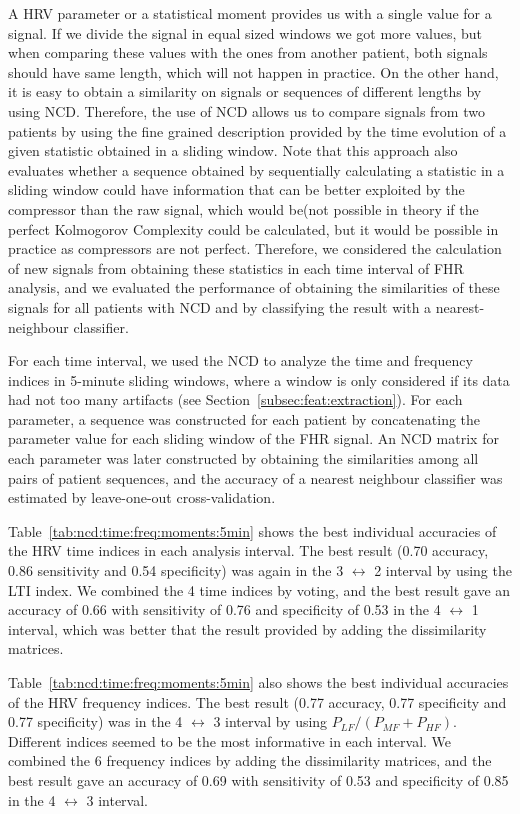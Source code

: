 A HRV parameter or a statistical moment provides us with a single value for a signal. If we divide the signal in equal sized windows we got more values, but when comparing  these values with the ones from another patient, both signals should have same length, which will not happen in practice. On the other hand, it is easy to obtain a similarity on signals or sequences of different lengths by using NCD. Therefore, the use of NCD allows us to compare signals from two patients by using the fine grained description provided by the time evolution of a given statistic obtained in a sliding window.
Note that this approach  also evaluates whether  a sequence obtained by sequentially calculating a statistic in a sliding window could have information that can be better exploited by the compressor than the raw signal, which would be(not possible in theory if the  perfect Kolmogorov Complexity could be calculated, but it would be possible in practice as compressors are not perfect.
Therefore, we considered  the calculation of new signals from obtaining these statistics in each time interval of FHR analysis, and we evaluated the performance of obtaining the similarities of these signals for all patients with NCD and by classifying the result with a nearest-neighbour classifier. 


For each time interval, we used the NCD to analyze the time and frequency indices in 5-minute sliding windows, where a window is only considered if its data had not too many artifacts (see Section~\ref{subsec:feat:extraction}). For each parameter, a sequence was constructed for each patient by  concatenating the parameter value for each sliding window of the FHR signal. An NCD matrix for each parameter was later constructed by obtaining the similarities among all pairs of patient sequences, and  the accuracy of a nearest neighbour classifier was estimated by leave-one-out cross-validation.

Table~\ref{tab:ncd:time:freq:moments:5min} shows the best individual accuracies of the HRV time indices in each analysis interval. The best result (0.70 accuracy, 0.86 sensitivity and 0.54 specificity) was again in the  3 $\leftrightarrow$  2 interval by using the LTI index. We combined the 4 time indices by voting, and the best result gave  an accuracy of 0.66 with sensitivity of 0.76 and specificity of 0.53 in the 4 $\leftrightarrow$  1 interval, which was better that the result provided by adding the dissimilarity matrices.


Table~\ref{tab:ncd:time:freq:moments:5min} also shows the best individual accuracies of the HRV frequency indices. The best result (0.77 accuracy, 0.77 specificity and 0.77 specificity) was in the  4 $\leftrightarrow$  3 interval by using $P_{LF} / (P_{MF}+P_{HF})$. Different indices seemed to be the most informative in each interval. We combined the 6 frequency indices by adding the dissimilarity matrices, and the best result gave an accuracy of 0.69 with sensitivity of 0.53  and specificity of 0.85 in the 4 $\leftrightarrow$  3 interval.

